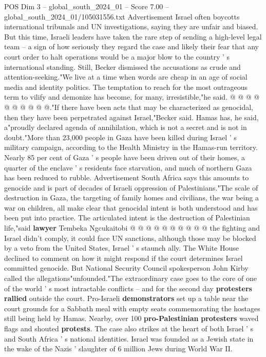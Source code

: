\begin{textsample}{POS Dim 3 – global\_south\_2024\_01 – Score 7.00 – global\_south\_2024\_01/105031556.txt}
Advertisement Israel often boycotts international tribunals and UN investigations, saying they are unfair and biased.
But this time, Israeli leaders have taken the rare step of sending a high-level legal team -- a sign of how seriously they regard the case and likely their fear that any court order to halt operations would be a major blow to the country ' s international standing.
Still, Becker dismissed the accusations as crude and attention-seeking."We live at a time when words are cheap in an age of social media and identity politics.
The temptation to reach for the most outrageous term to vilify and demonize has become, for many, irresistible,"he said. @ @ @ @ @ @ @ @ @ @."If there have been acts that may be characterized as genocidal, then they have been perpetrated against Israel,"Becker said.
Hamas has, he said, a"proudly declared agenda of annihilation, which is not a secret and is not in doubt."More than 23,000 people in Gaza have been killed during Israel ' s military campaign, according to the Health Ministry in the Hamas-run territory.
Nearly 85 per cent of Gaza ' s people have been driven out of their homes, a quarter of the enclave ' s residents face starvation, and much of northern Gaza has been reduced to rubble.
Advertisement South Africa says this amounts to genocide and is part of decades of Israeli oppression of Palestinians."The scale of destruction in Gaza, the targeting of family homes and civilians, the war being a war on children, all make clear that genocidal intent is both understood and has been put into practice.
The articulated intent is the destruction of Palestinian life,"said \textbf{lawyer} Tembeka Ngcukaitobi @ @ @ @ @ @ @ @ @ @ the fighting and Israel didn't comply, it could face UN sanctions, although those may be blocked by a veto from the United States, Israel ' s staunch ally.
The White House declined to comment on how it might respond if the court determines Israel committed genocide.
But National Security Council spokesperson John Kirby called the allegations"unfounded."The extraordinary case goes to the core of one of the world ' s most intractable conflicts -- and for the second day \textbf{protesters} \textbf{rallied} outside the court.
Pro-Israeli \textbf{demonstrators} set up a table near the court grounds for a Sabbath meal with empty seats commemorating the hostages still being held by Hamas.
Nearby, over 100 \textbf{pro-Palestinian} \textbf{protesters} waved flags and shouted \textbf{protests}.
The case also strikes at the heart of both Israel ' s and South Africa ' s national identities.
Israel was founded as a Jewish state in the wake of the Nazis ' slaughter of 6 million Jews during World War II.

\end{textsample}
